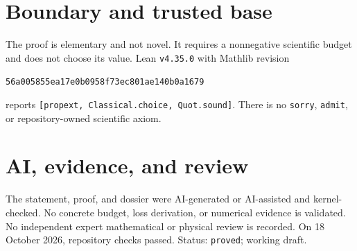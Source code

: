 \documentclass[11pt]{article}
\begin{document}
\section{Boundary and trusted base}
The proof is elementary and not novel. It requires a nonnegative scientific budget and
does not choose its value. Lean \texttt{v4.35.0} with Mathlib revision
\begin{center}\texttt{56a005855ea17e0b0958f73ec801ae140b0a1679}\end{center}
reports \texttt{[propext, Classical.choice, Quot.sound]}. There is no \texttt{sorry},
\texttt{admit}, or repository-owned scientific axiom.

\section{AI, evidence, and review}
The statement, proof, and dossier were AI-generated or AI-assisted and kernel-checked.
No concrete budget, loss derivation, or numerical evidence is validated. No independent
expert mathematical or physical review is recorded. On 18 October 2026, repository
checks passed. Status: \texttt{proved}; working draft.
\end{document}
